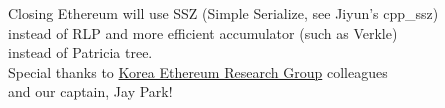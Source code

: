 \begin{frame}[fragile]{Closing}
Ethereum will use SSZ (Simple Serialize, see Jiyun's cpp\_ssz)\\
instead of RLP and more efficient accumulator (such as Verkle)\\
instead of Patricia tree.\\
\vspace{2ex}
Special thanks to \href{https://www.etherstudy.net/}{Korea Ethereum Research Group} colleagues\\
and our captain, Jay Park!
\end{frame}